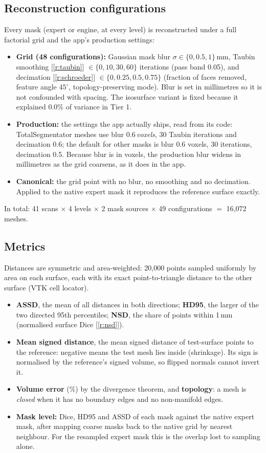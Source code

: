 \documentclass[10pt,a4paper]{article}
\newcommand{\rf}[1]{[\ref{#1}]}
\begin{document}
\subsection{Reconstruction configurations}
Every mask (expert or engine, at every level) is reconstructed under a full factorial grid and the app's production settings:
\begin{itemize}
\item \textbf{Grid (48 configurations):} Gaussian mask blur $\sigma\in\{0, 0.5, 1\}$\,mm, Taubin smoothing \rf{r:taubin} $\in\{0,10,30,60\}$ iterations (pass band 0.05), and decimation \rf{r:schroeder} $\in\{0,0.25,0.5,0.75\}$ (fraction of faces removed, feature angle $45^\circ$, topology-preserving mode). Blur is set in millimetres so it is not confounded with spacing. The isosurface variant is fixed because it explained 0.0\% of variance in Tier 1.
\item \textbf{Production:} the settings the app actually ships, read from its code: TotalSegmentator meshes use blur 0.6\,\emph{voxels}, 30 Taubin iterations and decimation 0.6; the default for other masks is blur 0.6 voxels, 30 iterations, decimation 0.5. Because blur is in voxels, the production blur widens in millimetres as the grid coarsens, as it does in the app.
\item \textbf{Canonical:} the grid point with no blur, no smoothing and no decimation. Applied to the native expert mask it reproduces the reference surface exactly.
\end{itemize}
In total: 41 scans $\times$ 4 levels $\times$ 2 mask sources $\times$ 49 configurations $=$ 16{,}072 meshes.

\subsection{Metrics}
Distances are symmetric and area-weighted: 20{,}000 points sampled uniformly by area on each surface, each with its exact point-to-triangle distance to the other surface (VTK cell locator).
\begin{itemize}
\item \textbf{ASSD}, the mean of all distances in both directions; \textbf{HD95}, the larger of the two directed 95th percentiles; \textbf{NSD}, the share of points within 1\,mm (normalised surface Dice \rf{r:nsd}).
\item \textbf{Mean signed distance}, the mean signed distance of test-surface points to the reference: negative means the test mesh lies inside (shrinkage). Its sign is normalised by the reference's signed volume, so flipped normals cannot invert it.
\item \textbf{Volume error} (\%) by the divergence theorem, and \textbf{topology}: a mesh is \emph{closed} when it has no boundary edges and no non-manifold edges.
\item \textbf{Mask level:} Dice, HD95 and ASSD of each mask against the native expert mask, after mapping coarse masks back to the native grid by nearest neighbour. For the resampled expert mask this is the overlap lost to sampling alone.
\end{itemize}
\end{document}
